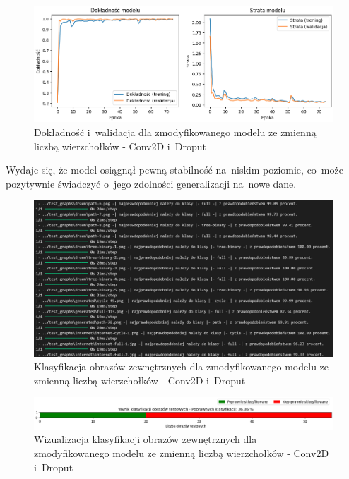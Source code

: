 \begin{figure}[ht]
	\centering
	\includegraphics[width=15.5cm]{resources/tests/images/v4/multiple_edges_1_img.png}
	\caption{Dokładność i~walidacja dla zmodyfikowanego modelu ze zmienną liczbą wierzchołków - Conv2D i~Droput}
	\label{Fig:tests-var-1a}
\end{figure}
\FloatBarrier

Wydaje się, że model osiągnął pewną stabilność na~niskim poziomie, co~może pozytywnie świadczyć o~jego zdolności generalizacji na~nowe dane.

\begin{figure}[ht]
	\centering
	\includegraphics[width=15.5cm]{resources/tests/images/v4/multiple_edges_1_txt.png}
	\caption{Klasyfikacja obrazów zewnętrznych dla zmodyfikowanego modelu ze zmienną liczbą wierzchołków - Conv2D i~Droput}
	\label{Fig:tests-var-1b}
\end{figure}
\FloatBarrier

\begin{figure}[ht]
	\centering
	\includegraphics[width=15.5cm]{resources/tests/images/v4/multiple_edges_1_bar.png}
	\caption{Wizualizacja klasyfikacji obrazów zewnętrznych dla zmodyfikowanego modelu ze zmienną liczbą wierzchołków - Conv2D i~Droput}
	\label{Fig:tests-var-1c}
\end{figure}
\FloatBarrier

